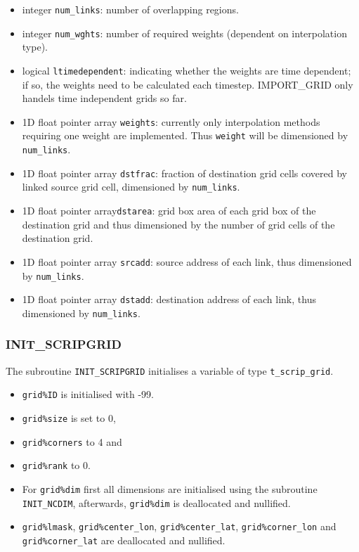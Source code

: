 \documentclass[11pt,twoside]{article}
\begin{document}
\begin{itemize}
\item integer \verb|num_links|: number of overlapping regions.
\item integer \verb|num_wghts|: number of required weights (dependent
      on interpolation type).
\item logical \verb|ltimedependent|: indicating whether the weights
are time dependent; if so, the weights need to be calculated each
timestep. IMPORT\_GRID only handels time independent grids so far.
\item 1D float pointer array \verb|weights|: currently only interpolation methods requiring
one weight are implemented. Thus \verb|weight| will be dimensioned
by \verb|num_links|.  
\item 1D float pointer array \verb|dstfrac|:  fraction of destination
grid cells covered by linked source grid cell, dimensioned by \verb|num_links|.
\item 1D float pointer array\verb|dstarea|: grid box area of each grid
box of the destination grid and thus dimensioned by the
number of grid cells of  the destination grid. 
\item 1D float pointer array \verb|srcadd|: source address of each link, thus dimensioned
by \verb|num_links|. 
\item 1D float pointer array \verb|dstadd|: destination address of
each link, thus dimensioned by \verb|num_links|. 
\end{itemize}


\subsubsection{INIT\_SCRIPGRID\label{INITSG}}
The subroutine \verb|INIT_SCRIPGRID| initialises a variable of
type \verb|t_scrip_grid|.
\begin{itemize}
\item \verb|grid%ID| is initialised with -99.
\item \verb|grid%size| is set to 0,
\item \verb|grid%corners| to 4 and 
\item \verb|grid%rank| to 0.
\item For \verb|grid%dim| first all dimensions are initialised using the
subroutine \verb|INIT_NCDIM|, afterwards, \verb|grid%dim| is
deallocated and nullified.
\item  \verb|grid%lmask|, \verb|grid%center_lon|, \verb|grid%center_lat|,
\verb|grid%corner_lon| and \verb|grid%corner_lat| are deallocated 
and nullified.
\end{itemize}
\end{document}
